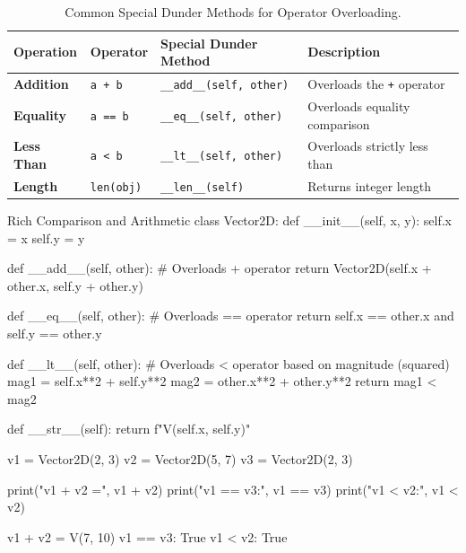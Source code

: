 \begin{table}[htbp]
\centering
\small
\renewcommand{\arraystretch}{1.3}
\begin{tabularx}{\linewidth}{lllX}
\toprule
\textbf{Operation} & \textbf{Operator} & \textbf{Special Dunder Method} & \textbf{Description} \\
\midrule
\textbf{Addition} & \texttt{a + b} & \texttt{\_\_add\_\_(self, other)} & Overloads the \texttt{+} operator \\
\textbf{Equality} & \texttt{a == b} & \texttt{\_\_eq\_\_(self, other)} & Overloads equality comparison \\
\textbf{Less Than} & \texttt{a < b} & \texttt{\_\_lt\_\_(self, other)} & Overloads strictly less than \\
\textbf{Length} & \texttt{len(obj)} & \texttt{\_\_len\_\_(self)} & Returns integer length \\
\bottomrule
\end{tabularx}
\caption{Common Special Dunder Methods for Operator Overloading.}
\label{tab:dunder-methods}
\end{table}

\begin{pythoncode}{Rich Comparison and Arithmetic}
class Vector2D:
    def __init__(self, x, y):
        self.x = x
        self.y = y
        
    def __add__(self, other):
        # Overloads + operator
        return Vector2D(self.x + other.x, self.y + other.y)
        
    def __eq__(self, other):
        # Overloads == operator
        return self.x == other.x and self.y == other.y
        
    def __lt__(self, other):
        # Overloads < operator based on magnitude (squared)
        mag1 = self.x**2 + self.y**2
        mag2 = other.x**2 + other.y**2
        return mag1 < mag2
        
    def __str__(self):
        return f"V({self.x}, {self.y})"

v1 = Vector2D(2, 3)
v2 = Vector2D(5, 7)
v3 = Vector2D(2, 3)

print("v1 + v2 =", v1 + v2)
print("v1 == v3:", v1 == v3)
print("v1 < v2:", v1 < v2)
\end{pythoncode}

\begin{outputbox}
v1 + v2 = V(7, 10)
v1 == v3: True
v1 < v2: True
\end{outputbox}

